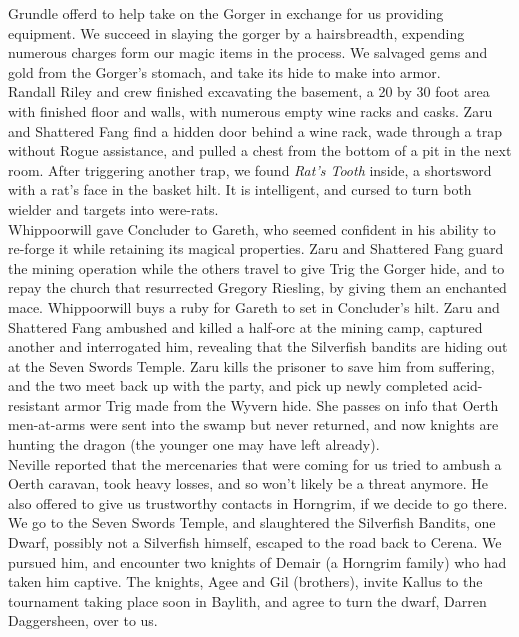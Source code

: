 \documentclass[letterpaper]{article}
\begin{document}
\noindent Grundle offerd to help take on the Gorger in exchange for us providing equipment. We succeed in slaying the gorger by a hairsbreadth, expending numerous charges form our magic items in the process. We salvaged gems and gold from the Gorger's stomach, and take its hide to make into armor.\\

\noindent Randall Riley and crew finished excavating the basement, a 20 by 30 foot area with finished floor and walls, with numerous empty wine racks and casks.  Zaru and Shattered Fang find a hidden door behind a wine rack, wade through a trap without Rogue assistance, and pulled a chest from the bottom of a pit in the next room.  After triggering another trap, we found \emph{Rat's Tooth} inside, a shortsword with a rat's face in the basket hilt.  It is intelligent, and cursed to turn both wielder and targets into were-rats.  \\

\noindent Whippoorwill gave Concluder to Gareth, who seemed confident in his ability to re-forge it while retaining its magical properties. Zaru and Shattered Fang guard the mining operation while the others travel to give Trig the Gorger hide, and to repay the church that resurrected Gregory Riesling, by giving them an enchanted mace. Whippoorwill buys a ruby for Gareth to set in Concluder's hilt. Zaru and Shattered Fang ambushed and killed a half-orc at the mining camp, captured another and interrogated him, revealing that the Silverfish bandits are hiding out at the Seven Swords Temple. Zaru kills the prisoner to save him from suffering, and the two meet back up with the party, and pick up newly completed acid-resistant armor Trig made from the Wyvern hide.  She passes on info that Oerth men-at-arms were sent into the swamp but never returned, and now knights are hunting the dragon (the younger one may have left already).\\

\noindent Neville reported that the mercenaries that were coming for us tried to ambush a Oerth caravan, took heavy losses, and so won't likely be a threat anymore.  He also offered to give us trustworthy contacts in Horngrim, if we decide to go there.\\

\noindent We go to the Seven Swords Temple, and slaughtered the Silverfish Bandits, one Dwarf, possibly not a Silverfish himself, escaped to the road back to Cerena. We pursued him, and encounter two knights of Demair (a Horngrim family) who had taken him captive. The knights, Agee and Gil (brothers), invite Kallus to the tournament taking place soon in Baylith, and agree to turn the dwarf, Darren Daggersheen, over to us.\\
\end{document}
